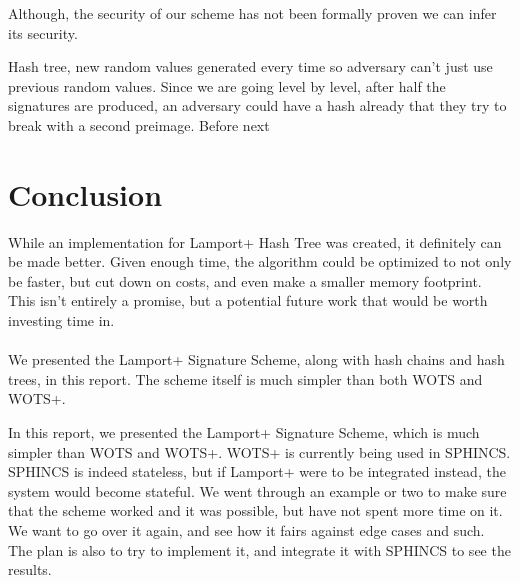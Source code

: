 \documentclass[]{scrartcl}
\begin{document}
Although, the security of our scheme has not been formally proven we can infer its security.

Hash tree, new random values generated every time so adversary can't just use previous random values. Since we are going level by level, after half the signatures are produced, an adversary could have a hash already that they try to break with a second preimage.
Before next 

\section*{Conclusion}
While an implementation for Lamport+ Hash Tree was created, it definitely can be made better. Given enough time, the algorithm could be optimized to not only be faster, but cut down on costs, and even make a smaller memory footprint. This isn't entirely a promise, but a potential future work that would be worth investing time in.\\ \\

We presented the Lamport+ Signature Scheme, along with hash chains and hash trees, in this report. The scheme itself is much simpler than both WOTS and WOTS+. 

In this report, we presented the Lamport+ Signature Scheme, which is much simpler than WOTS and WOTS+. WOTS+ is currently being used in SPHINCS. SPHINCS is indeed stateless, but if Lamport+ were to be integrated instead, the system would become stateful. We went through an example or two to make sure that the scheme worked and it was possible, but have not spent more time on it. We want to go over it again, and see how it fairs against edge cases and such. The plan is also to try to implement it, and integrate it with SPHINCS to see the results.
\end{document}
